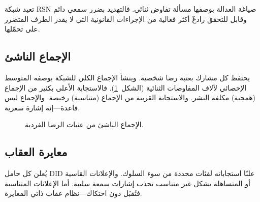 \documentclass[11pt,a4paper,twocolumn]{article}
\begin{document}
تعيد شبكة RSN صياغة العدالة بوصفها مسألة تفاوض ثنائي. فالتهديد بضرر سمعي دائم وقابل للتحقق رادعٌ أكثر فعالية من الإجراءات القانونية التي لا يقدر الطرف المتضرر على تحمّلها.

\subsection{الإجماع الناشئ}

يحتفظ كل مشارك بعتبة رضا شخصية. وينشأ الإجماع الكلي للشبكة بوصفه المتوسط الإحصائي لآلاف المفاوضات الثنائية (الشكل~\ref{fig:consensus}). فالاستجابة الأعلى بكثير من الإجماع (همجية) مكلفة النشر. والاستجابة القريبة من الإجماع (متناسبة) رخيصة. والإجماع ليس قاعدة---إنه إشارة سعرية.

\begin{figure}[ht]
\centering
{}
\caption{الإجماع الناشئ من عتبات الرضا الفردية.}
\label{fig:consensus}
\end{figure}

\subsection{معايرة العقاب}

يُعلن كل حامل DID علنًا استجاباته لفئات محددة من سوء السلوك. والإعلانات القاسية أو المتساهلة بشكل غير متناسب تجذب إشارات سمعة سلبية. أما الإعلانات المتناسبة فتُقبَل دون احتكاك---نظام عقاب ذاتي المعايرة.
\end{document}
